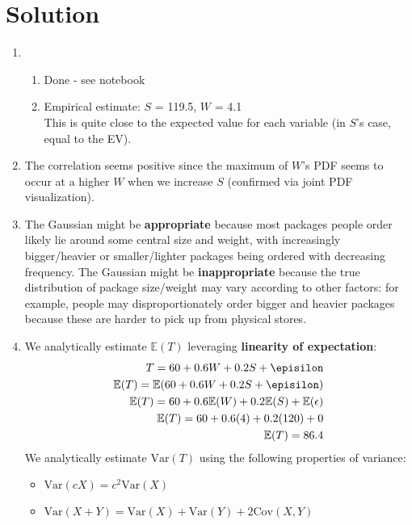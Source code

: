 \documentclass{harvardml}
\theoremstyle{definition}
\theoremstyle{plain}
\newenvironment{solution}
  {\color{blue}\section*{Solution}}
{}
\begin{document}
\begin{solution}
	\begin{enumerate}
        \item
            \begin{enumerate}
                \item Done - see notebook
                \item Empirical estimate: $S$ = 119.5, $W$ = 4.1\\
                This is quite close to the expected value for each variable (in $S$'s case, equal to the EV). 
            \end{enumerate}
        \item The correlation seems positive since the maximum of $W$'s PDF seems to occur at a higher $W$ when we increase $S$ (confirmed via joint PDF visualization).
        \item The Gaussian might be \textbf{appropriate} because most packages people order likely lie around some central size and weight, with increasingly bigger/heavier or smaller/lighter packages being ordered with decreasing frequency. The Gaussian might be \textbf{inappropriate} because the true distribution of package size/weight may vary according to other factors: for example, people may disproportionately order bigger and heavier packages because these are harder to pick up from physical stores.
        \item We analytically estimate $\mathbb{E}(T)$ leveraging \textbf{linearity of expectation}:\\
        \begin{align*}
            T = 60 + 0.6W + 0.2S + \episilon\\
            \mathbb{E}(T) = \mathbb{E}(60 + 0.6W + 0.2S + \episilon)\\
            \mathbb{E}(T) = 60 + 0.6\mathbb{E}(W) + 0.2\mathbb{E}(S) + \mathbb{E}(\epsilon)\\
            \mathbb{E}(T) = 60 + 0.6(4) + 0.2(120) + 0\\
            \mathbb{E}(T) = 86.4
        \end{align*}
        We analytically estimate $\mathrm{Var}(T)$ using the following properties of variance:\\
        \begin{itemize}
            \item $\mathrm{Var}(cX) = c^2\mathrm{Var}(X)$
            \item $\mathrm{Var}(X + Y) = \mathrm{Var}(X) + \mathrm{Var}(Y) + 2\mathrm{Cov}(X,Y)$

\end{itemize}
\end{enumerate}
\end{solution}
\end{document}
